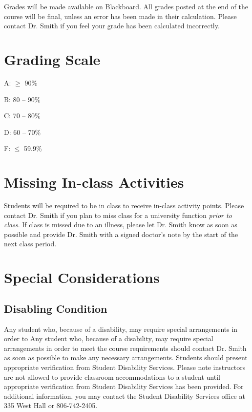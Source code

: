 \documentclass[12pt, notitlepage]{article}   	%
\begin{document}
Grades will be made available on Blackboard. 
All grades posted at the end of the course will be final, 
unless an error has been made in their calculation.
Please contact Dr. Smith if you feel your grade has been calculated incorrectly.

\section{Grading Scale}
A: $\geq$ 90\% \par
B: 80 – 90\% \par
C: 70 – 80\% \par
D: 60 – 70\% \par
F: $\leq$ 59.9\% \par

\section{Missing In-class Activities}
Students will be required to be in class to receive in-class activity points. 
Please contact Dr. Smith if you plan to miss class for a university function 
\textit{prior to class}. If class is missed due to an illness, 
please let Dr. Smith know as soon as possible and provide Dr. Smith with 
a signed doctor’s note by the start of the next class period.

\section{Special Considerations}
\subsection{Disabling Condition}
Any student who, because of a disability, may require special arrangements in order to 
Any student who, because of a disability, may require special arrangements in order to 
meet the course requirements should contact Dr. Smith as soon as possible to make 
any necessary arrangements. Students should present appropriate verification from Student 
Disability Services. Please note instructors are not 
allowed to provide classroom accommodations to a student until appropriate verification 
from Student Disability Services has been provided. For additional information, you may 
contact the Student Disability Services office at 335 West Hall or 806-742-2405.
\end{document}
